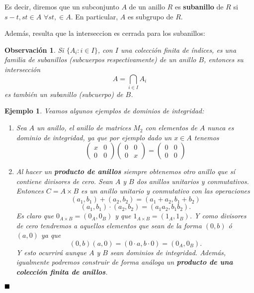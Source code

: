\documentclass[12pt]{article}
\newtheorem{example}{Ejemplo}[theorem]
\newtheorem{observation}{Observación}[theorem]
\begin{document}
Es decir, diremos que un subconjunto $A$ de un anillo $R$ es \textbf{subanillo} de $R$ si $s-t, st \in A$ \hspace{0.1cm} $\forall st, \in A$. En particular, $A$ es subgrupo de $R$.

Además, resulta que la interseccion es cerrada para los subanillos: 

\begin{observation} Si $\lbrace A_{i}: i \in I\rbrace$, con $I$ una colección finita de índices, es una familia de subanillos (subcuerpos respectivamente) de un anillo $B$, entonces su intersección $$A = \bigcap_{i \in I} A_{i}$$ es también un subanillo (subcuerpo) de $B$.
\end{observation}


\begin{example} Veamos algunos ejemplos de dominios de integridad: \begin{enumerate}
\item Sea $A$ un anillo, el anillo de matrices $M_{2}$ con elementos de $A$ nunca es dominio de integridad, ya que por ejemplo dado un $x \in A$ tenemos $$\left( \begin{matrix}
x & 0 \\
0 & 0
\end{matrix}
\right) \left( \begin{matrix}
0 & 0 \\
0 & x
\end{matrix}
\right) = \left( \begin{matrix}
0 & 0 \\
0 & 0
\end{matrix}
\right)$$
\item Al hacer un \textbf{producto de anillos} siempre obtenemos otro anillo que sí contiene divisores de cero. Sean $A$ y $B$ dos anillos unitarios y conmutativos. Entonces $C = A \times B$ es un anillo unitario y conmutativo con las operaciones $$(a_{1},b_{1}) + (a_{2},b_{2}) = (a_{1}+a_{2}, b_{1}+b_{2})$$ $$(a_{1},b_{1}) \cdot (a_{2},b_{2}) = (a_{1}a_{2},b_{1}b_{2}).$$ Es claro que $0_{A\times B} = (0_{A},0_{B})$ y que $1_{A \times B} = (1_{A},1_{B})$. Y como divisores de cero tendremos a aquellos elementos que sean de la forma $(0,b)$ ó $(a,0)$ ya que $$(0,b)(a,0) = (0 \cdot a, b \cdot 0) = (0_{A}, 0_{B}).$$ Y esto ocurrirá aunque $A$ y $B$ sean dominios de integridad. Además, igualmente podremos construir de forma análoga un \textbf{producto de una colección finita de anillos}.
\end{enumerate}
\end{example}
$\hfill \blacksquare$
\end{document}
